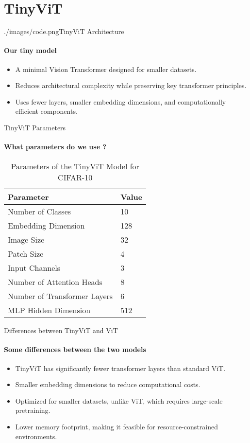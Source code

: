 \section{TinyViT}

\begin{sidepic}{./images/code.png}{TinyViT Architecture}
  \framesubtitle{Our tiny model}
  \begin{itemize}
    \item A minimal Vision Transformer designed for smaller datasets.
    \item Reduces architectural complexity while preserving key transformer principles.
    \item Uses fewer layers, smaller embedding dimensions, and computationally efficient components.
  \end{itemize}
\end{sidepic}

\begin{frame}[fragile]{TinyViT Parameters}
  \framesubtitle{What parameters do we use ?}
  \begin{table}[htbp]
    \small
    \centering
    \caption{Parameters of the TinyViT Model for CIFAR-10}
    \begin{tabular}{@{}ll@{}}
      \toprule
      \textbf{Parameter} & \textbf{Value} \\
      \midrule
      Number of Classes & 10 \\
      Embedding Dimension & 128 \\
      Image Size & 32 \\
      Patch Size & 4 \\
      Input Channels & 3 \\
      Number of Attention Heads & 8 \\
      Number of Transformer Layers & 6 \\
      MLP Hidden Dimension & 512 \\
      \bottomrule
    \end{tabular}
  \end{table}
\end{frame}

\begin{frame}{Differences between TinyViT and ViT}
  \framesubtitle{Some differences between the two models}
  \begin{itemize}
    \item TinyViT has significantly fewer transformer layers than standard ViT.
    \item Smaller embedding dimensions to reduce computational costs.
    \item Optimized for smaller datasets, unlike ViT, which requires large-scale pretraining.
    \item Lower memory footprint, making it feasible for resource-constrained environments.
  \end{itemize}
\end{frame}